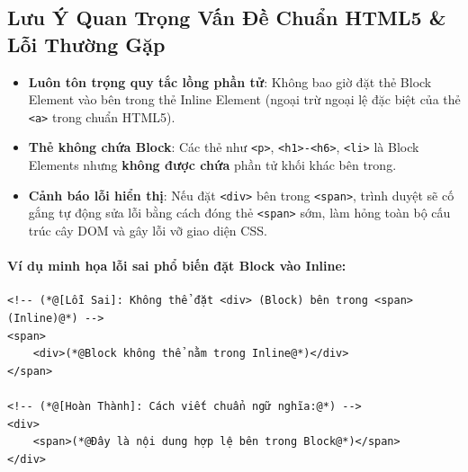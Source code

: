 \documentclass[11pt,oneside]{book}
\newcommand{\codeinline}[1]{\textcolor{accentOrange}{\texttt{#1}}}
\begin{document}
\subsection{Lưu Ý Quan Trọng Vấn Đề Chuẩn HTML5 \& Lỗi Thường Gặp}

\begin{warnBox}
\begin{itemize}[leftmargin=1.5em, itemsep=3pt, parsep=0pt]
    \item \textbf{Luôn tôn trọng quy tắc lồng phần tử}: Không bao giờ đặt thẻ Block Element vào bên trong thẻ Inline Element (ngoại trừ ngoại lệ đặc biệt của thẻ \codeinline{<a>} trong chuẩn HTML5).
    \item \textbf{Thẻ không chứa Block}: Các thẻ như \codeinline{<p>}, \codeinline{<h1>-<h6>}, \codeinline{<li>} là Block Elements nhưng \textbf{không được chứa} phần tử khối khác bên trong.
    \item \textbf{Cảnh báo lỗi hiển thị}: Nếu đặt \codeinline{<div>} bên trong \codeinline{<span>}, trình duyệt sẽ cố gắng tự động sửa lỗi bằng cách đóng thẻ \codeinline{<span>} sớm, làm hỏng toàn bộ cấu trúc cây DOM và gây lỗi vỡ giao diện CSS.
\end{itemize}
\end{warnBox}

\paragraph{Ví dụ minh họa lỗi sai phổ biến đặt Block vào Inline:}
\begin{codeWindow}
\begin{lstlisting}[language=HTML5]
<!-- (*@[Lỗi Sai]: Không thể đặt <div> (Block) bên trong <span> (Inline)@*) -->
<span>
    <div>(*@Block không thể nằm trong Inline@*)</div>
</span>

<!-- (*@[Hoàn Thành]: Cách viết chuẩn ngữ nghĩa:@*) -->
<div>
    <span>(*@Đây là nội dung hợp lệ bên trong Block@*)</span>
</div>
\end{lstlisting}
\end{codeWindow}
\end{document}
